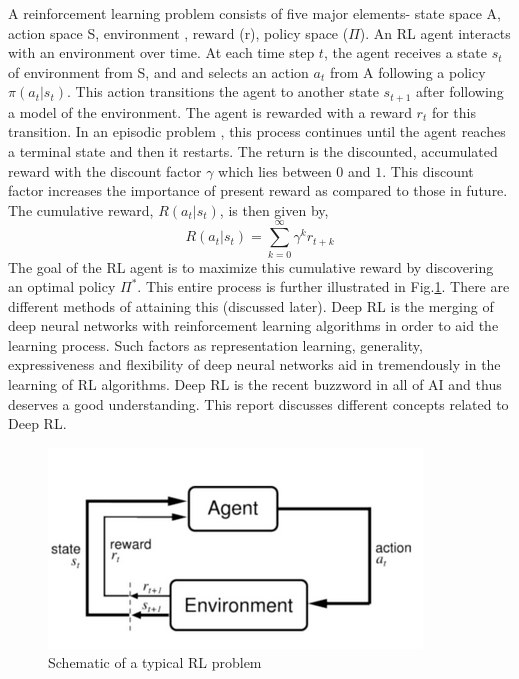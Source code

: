 \documentclass[aps, pre, reprint]{revtex4-1}
\newcommand{\be}{\begin{equation}}
\newcommand{\ee}{\end{equation}}
\begin{document}
A reinforcement learning problem consists of five major elements- state space A, action space S, environment , reward (r), policy space ($\Pi$). An RL agent interacts with an environment over time. At each time step $t$, the agent receives a state $s_t$ of environment from S, and and selects an action $a_t$
from A following a policy $\pi(a_t|s_t)$. This action transitions the agent to another state $s_{t+1}$ after following a model of the environment. The agent is rewarded with a reward $r_t$ for this transition. In  an episodic problem , this process continues until the agent reaches a terminal state and then it restarts. The return is the discounted, accumulated reward with the discount factor $\gamma$ which lies between $0$ and $1$. This discount factor increases the importance of present reward as compared to those in future. The cumulative reward, $R(a_t|s_t)$, is then given by,
\be
R(a_t|s_t) = \sum_{k=0}^{\infty} \gamma^{k}r_{t+k}
\ee
The goal of the RL agent is to maximize this cumulative reward by discovering an optimal policy $\Pi^{*}$. This entire process is further illustrated in Fig.\ref{fig:fig_1}.  There are different methods of attaining this (discussed later). Deep RL is the merging of deep neural networks with reinforcement learning algorithms in order to aid the learning process. Such factors as representation learning, generality, expressiveness and flexibility of deep neural networks aid in tremendously in the learning of RL algorithms. Deep RL is the recent buzzword in all of AI and thus deserves a good understanding. This report discusses different concepts related to Deep RL. \\

\begin{figure}[ht!]
\begin{center}
\includegraphics[scale=0.4]{rl_pic.png}
\end{center}
\caption { Schematic of a typical RL problem}
\label{fig:fig_1} 
\end{figure}
     
\end{document}
